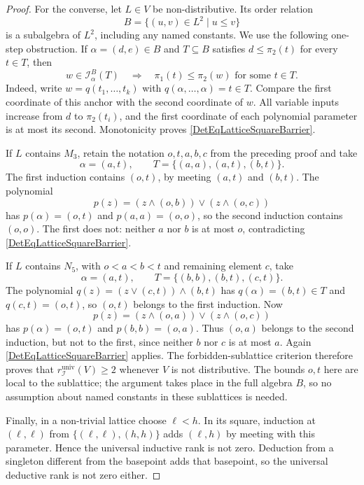 \documentclass[10pt,a4paper]{amsart}
\begin{document}
\begin{proof}
For the converse, let $L\in V$ be non-distributive. Its order relation
\[
B=\{(u,v)\in L^2\mid u\leqslant v\}
\]
is a subalgebra of $L^2$, including any named constants. We use the
following one-step obstruction. If $\alpha=(d,e)\in B$ and
$T\subseteq B$ satisfies $d\leqslant\pi_2(t)$ for every $t\in T$,
then
\begin{equation}\label{DetEqLatticeSquareBarrier}
w\in\mathcal I_\alpha^B(T)
\quad\Longrightarrow\quad
\pi_1(t)\leqslant\pi_2(w)\text{ for some }t\in T.
\end{equation}
Indeed, write $w=q(t_1,\ldots,t_k)$ with
$q(\alpha,\ldots,\alpha)=t\in T$. Compare the first coordinate of
this anchor with the second coordinate of $w$. All variable inputs
increase from $d$ to $\pi_2(t_i)$, and the first coordinate of each
polynomial parameter is at most its second. Monotonicity proves
\eqref{DetEqLatticeSquareBarrier}.

If $L$ contains $M_3$, retain the notation $o,t,a,b,c$ from the
preceding proof and take
\[
\alpha=(a,t),\qquad
T=\{(a,a),(a,t),(b,t)\}.
\]
The first induction contains $(o,t)$, by meeting $(a,t)$ and $(b,t)$.
The polynomial
\[
p(z)=(z\wedge(o,b))\vee(z\wedge(o,c))
\]
has $p(\alpha)=(o,t)$ and $p(a,a)=(o,o)$, so the second induction
contains $(o,o)$. The first does not: neither $a$ nor $b$ is at most
$o$, contradicting \eqref{DetEqLatticeSquareBarrier}.

If $L$ contains $N_5$, with $o<a<b<t$ and remaining element $c$, take
\[
\alpha=(a,t),\qquad
T=\{(b,b),(b,t),(c,t)\}.
\]
The polynomial $q(z)=(z\vee(c,t))\wedge(b,t)$ has
$q(\alpha)=(b,t)\in T$ and $q(c,t)=(o,t)$, so $(o,t)$ belongs to
the first induction. Now
\[
p(z)=(z\wedge(o,a))\vee(z\wedge(o,c))
\]
has $p(\alpha)=(o,t)$ and $p(b,b)=(o,a)$. Thus $(o,a)$ belongs to
the second induction, but not to the first, since neither $b$ nor
$c$ is at most $a$. Again \eqref{DetEqLatticeSquareBarrier} applies.
The forbidden-sublattice criterion therefore proves that
$r_{\mathcal I}^{\mathrm{univ}}(V)\geqslant2$ whenever $V$ is not
distributive. The bounds $o,t$ here are local to the sublattice;
the argument takes place in the full algebra $B$, so no assumption
about named constants in these sublattices is needed.

Finally, in a non-trivial lattice choose $\ell<h$. In its square,
induction at $(\ell,\ell)$ from
$\{(\ell,\ell),(h,h)\}$ adds $(\ell,h)$ by meeting with this
parameter. Hence the universal inductive rank is not zero.
Deduction from a singleton different from the basepoint adds that
basepoint, so the universal deductive rank is not zero either.
\end{proof}
\end{document}
